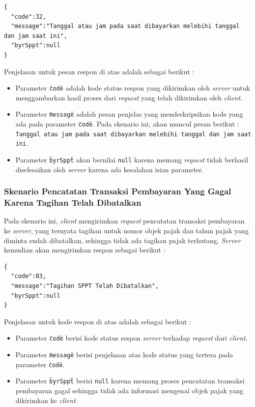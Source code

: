 \documentclass[pdftex,12pt, oneside]{article}
\begin{document}
  \begin{lstlisting}
{
  "code":32,
  "message":"Tanggal atau jam pada saat dibayarkan melebihi tanggal dan jam saat ini",
  "byrSppt":null
}
  \end{lstlisting}
  
  Penjelasan untuk pesan respon di atas adalah sebagai berikut :
  
  \begin{itemize}
    \item Parameter \texttt{\"code\"} adalah kode status respon yang dikirimkan oleh \textit{server} untuk menggambarkan hasil proses dari \textit{request} yang telah dikirimkan oleh \textit{client}.
    \item Parameter \texttt{\"message\"} adalah pesan penjelas yang mendeskripsikan kode yang ada pada parameter \texttt{\"code\"}. Pada skenario ini, akan muncul pesan berikut : \texttt{Tanggal atau jam pada saat dibayarkan melebihi tanggal dan jam saat ini}.
    \item Parameter \texttt{\"byrSppt\"} akan bernilai \texttt{null} karena memang \textit{request} tidak berhasil diselesaikan oleh \textit{server} karena ada kesalahan isian parameter.
  \end{itemize}
  
  \subsubsection{Skenario Pencatatan Transaksi Pembayaran Yang Gagal Karena Tagihan Telah Dibatalkan}
  
  Pada skenario ini, \textit{client} mengirimkan \textit{request} pencatatan transaksi pembayaran ke \textit{server}, yang ternyata tagihan untuk nomor objek pajak dan tahun pajak yang diminta sudah dibatalkan, sehingga tidak ada tagihan pajak terhutang. \textit{Server} kemudian akan mengirimkan respon sebagai berikut :
  
  \begin{lstlisting}
{
  "code":03,
  "message":"Tagihan SPPT Telah Dibatalkan",
  "byrSppt":null
}
  \end{lstlisting}
  
  Penjelasan untuk kode respon di atas adalah sebagai berikut :
  
  \begin{itemize}[H]
    \item Parameter \texttt{\"code\"} berisi kode status respon \textit{server} terhadap \textit{request} dari \textit{client}.
    \item Parameter \texttt{\"message\"} berisi penjelasan atas kode status yang tertera pada parameter \texttt{\"code\"}.
    \item Parameter \texttt{\"byrSppt\"} berisi \texttt{null} karena memang proses pencatatan transaksi pembayaran gagal sehingga tidak ada informasi mengenai objek pajak yang dikirimkan ke \textit{client}.
  \end{itemize}
  
\end{document}
